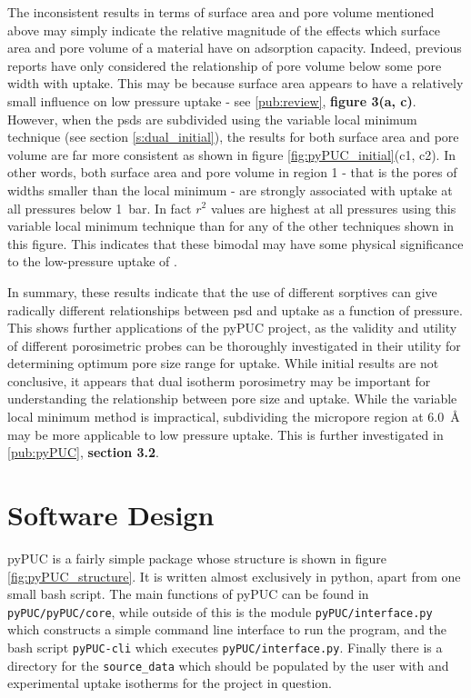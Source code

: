 The inconsistent results in terms of surface area and pore volume mentioned above may simply indicate the relative magnitude of the effects which surface area and pore volume of a material have on \gls{adsorption} capacity. Indeed, previous reports have only considered the relationship of pore volume below some pore width with  uptake.\citep{Presser2011Effect, Sevilla2013Assessment, Adeniran2016Is, Wickramaratne2013Importance} This may be because surface area appears to have a relatively small influence on low pressure  uptake\citep{Sevilla2021More, Ludwinowicz2015Effect, Singh2019CO2, GrauMarin2020Evaluation} - see \ref{pub:review}, \textbf{figure 3(a, c)}. However, when the \glspl{psd} are subdivided using the variable local minimum technique (see section \ref{s:dual_initial}), the results for both surface area and pore volume are far more consistent as shown in figure \ref{fig:pyPUC_initial}(c1, c2). In other words, both surface area and pore volume in region 1 - that is the pores of widths smaller than the local minimum - are strongly associated with  uptake at all pressures below \qty{1}{\bar}. In fact $r^2$ values are highest at all pressures using this variable local minimum technique than for any of the other techniques shown in this figure. This indicates that these bimodal  may have some physical significance to the low-pressure uptake of .

In summary, these results indicate that the use of different sorptives can give radically different relationships between \gls{psd} and  uptake as a function of pressure. This shows further applications of the pyPUC project, as the validity and utility of different porosimetric probes can be thoroughly investigated in their utility for determining optimum pore size range for  uptake. While initial results are not conclusive, it appears that dual isotherm porosimetry may be important for understanding the relationship between pore size and  uptake. While the variable local minimum method is impractical, subdividing the \gls{micropore} region at \qty{6.0}{\angstrom} may be more applicable to low pressure  uptake. This is further investigated in \ref{pub:pyPUC}, \textbf{section 3.2}.

\section{Software Design}
\label{s:pypuc_design}
pyPUC is a fairly simple package whose structure is shown in figure \ref{fig:pyPUC_structure}. It is written almost exclusively in python,\citep{python1995} apart from one small bash script.\citep{bash2007} The main functions of pyPUC can be found in \verb|pyPUC/pyPUC/core|, while outside of this is the module \verb|pyPUC/interface.py| which constructs a simple command line interface to run the program, and the bash script \verb|pyPUC-cli| which executes \verb|pyPUC/interface.py|. Finally there is a directory for the \verb|source_data| which should be populated by the user with  and experimental uptake isotherms for the project in question.

